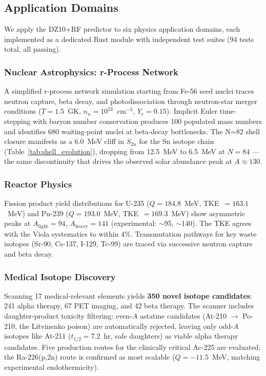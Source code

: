 \documentclass[letterpaper,11pt]{article}
\begin{document}
\subsection{Application Domains}

We apply the DZ10+RF predictor to six physics application domains, each
implemented as a dedicated Rust module with independent test suites (94 tests
total, all passing).

\subsubsection{Nuclear Astrophysics: r-Process Network}

A simplified r-process network simulation starting from Fe-56 seed nuclei traces
neutron capture, beta decay, and photodissociation through neutron-star merger
conditions ($T = 1.5$~GK, $n_n = 10^{24}$~cm$^{-3}$, $Y_e = 0.15$). Implicit
Euler time-stepping with baryon number conservation produces 100 populated mass
numbers and identifies 680 waiting-point nuclei at beta-decay bottlenecks. The
N=82 shell closure manifests as a 6.0~MeV cliff in $S_{2n}$ for the Sn isotope
chain (Table~\ref{tab:shell_evolution}), dropping from 12.5~MeV to 6.5~MeV at $N=84$
---the same discontinuity that drives the observed solar abundance peak at
$A \approx 130$.

\subsubsection{Reactor Physics}

Fission product yield distributions for U-235 ($Q = 184.8$~MeV, TKE~$= 163.1$~MeV)
and Pu-239 ($Q = 193.0$~MeV, TKE~$= 169.3$~MeV) show asymmetric peaks at
$A_\text{light} = 94$, $A_\text{heavy} = 141$ (experimental: $\sim$95, $\sim$140).
The TKE agrees with the Viola systematics to within 4\%. Transmutation pathways
for key waste isotopes (Sr-90, Cs-137, I-129, Tc-99) are traced via successive
neutron capture and beta decay.

\subsubsection{Medical Isotope Discovery}

Scanning 17 medical-relevant elements yields \textbf{350 novel isotope candidates}:
241 alpha therapy, 67 PET imaging, and 42 beta therapy. The scanner includes daughter-product toxicity filtering: even-$A$
astatine candidates (At-210 $\to$ Po-210, the Litvinenko poison) are
automatically rejected, leaving only odd-$A$ isotopes like At-211 ($t_{1/2}
= 7.2$~hr, safe daughters) as viable alpha therapy candidates. Five production routes for the clinically critical
Ac-225 are evaluated; the Ra-226(p,2n) route is confirmed as most scalable
($Q = -11.5$~MeV, matching experimental endothermicity).
\end{document}
